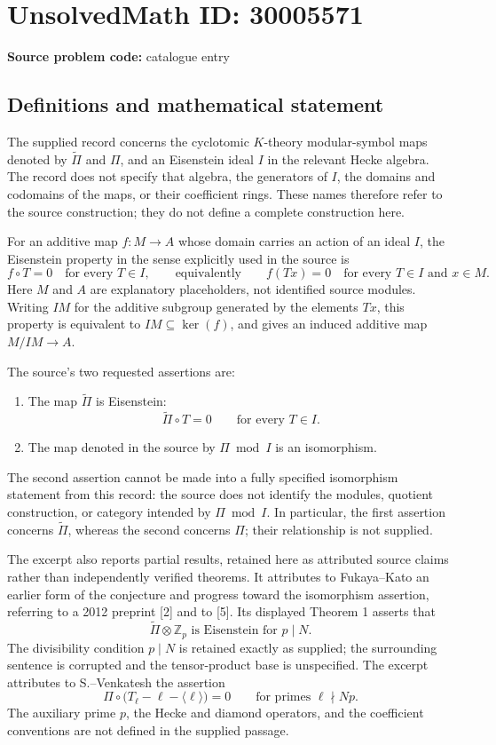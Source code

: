 \documentclass[11pt]{article}
\begin{document}
\section*{UnsolvedMath ID: 30005571}
\textbf{Source problem code:} catalogue entry
\subsection{Definitions and mathematical statement}
The supplied record concerns the cyclotomic \(K\)-theory modular-symbol maps denoted by \(\widetilde\Pi\) and \(\Pi\), and an Eisenstein ideal \(I\) in the relevant Hecke algebra. The record does not specify that algebra, the generators of \(I\), the domains and codomains of the maps, or their coefficient rings. These names therefore refer to the source construction; they do not define a complete construction here.

For an additive map \(f\colon M\to A\) whose domain carries an action of an ideal \(I\), the Eisenstein property in the sense explicitly used in the source is
\[
 f\circ T=0\quad\text{for every }T\in I,
 \qquad\text{equivalently}\qquad
 f(Tx)=0\quad\text{for every }T\in I\text{ and }x\in M.
\]
Here \(M\) and \(A\) are explanatory placeholders, not identified source modules. Writing \(IM\) for the additive subgroup generated by the elements \(Tx\), this property is equivalent to \(IM\subseteq\ker(f)\), and gives an induced additive map \(M/IM\to A\).

The source's two requested assertions are:
\begin{enumerate}
\item The map \(\widetilde\Pi\) is Eisenstein:
\[
 \widetilde\Pi\circ T=0\qquad\text{for every }T\in I.
\]
\item The map denoted in the source by \(\Pi\bmod I\) is an isomorphism.
\end{enumerate}
The second assertion cannot be made into a fully specified isomorphism statement from this record: the source does not identify the modules, quotient construction, or category intended by \(\Pi\bmod I\). In particular, the first assertion concerns \(\widetilde\Pi\), whereas the second concerns \(\Pi\); their relationship is not supplied.

The excerpt also reports partial results, retained here as attributed source claims rather than independently verified theorems. It attributes to Fukaya--Kato an earlier form of the conjecture and progress toward the isomorphism assertion, referring to a 2012 preprint [2] and to [5]. Its displayed Theorem 1 asserts that
\[
 \widetilde\Pi\otimes\mathbb Z_p\text{ is Eisenstein for }p\mid N.
\]
The divisibility condition \(p\mid N\) is retained exactly as supplied; the surrounding sentence is corrupted and the tensor-product base is unspecified. The excerpt attributes to S.--Venkatesh the assertion
\[
 \Pi\circ\bigl(T_\ell-\ell-\langle\ell\rangle\bigr)=0
 \qquad\text{for primes }\ell\nmid Np.
\]
The auxiliary prime \(p\), the Hecke and diamond operators, and the coefficient conventions are not defined in the supplied passage.
\end{document}
